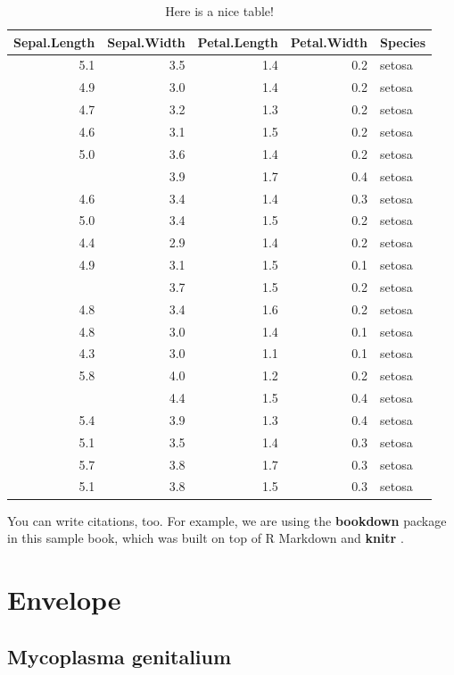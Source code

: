 \documentclass[]{tufte-book}
\begin{document}
\begin{table}[t]

\caption{\label{tab:nice-tab}Here is a nice table!}
\centering
\begin{tabular}{rrrrl}
\toprule
Sepal.Length & Sepal.Width & Petal.Length & Petal.Width & Species\\
\midrule
5.1 & 3.5 & 1.4 & 0.2 & setosa\\
4.9 & 3.0 & 1.4 & 0.2 & setosa\\
4.7 & 3.2 & 1.3 & 0.2 & setosa\\
4.6 & 3.1 & 1.5 & 0.2 & setosa\\
5.0 & 3.6 & 1.4 & 0.2 & setosa\\
\addlinespace
5.4 & 3.9 & 1.7 & 0.4 & setosa\\
4.6 & 3.4 & 1.4 & 0.3 & setosa\\
5.0 & 3.4 & 1.5 & 0.2 & setosa\\
4.4 & 2.9 & 1.4 & 0.2 & setosa\\
4.9 & 3.1 & 1.5 & 0.1 & setosa\\
\addlinespace
5.4 & 3.7 & 1.5 & 0.2 & setosa\\
4.8 & 3.4 & 1.6 & 0.2 & setosa\\
4.8 & 3.0 & 1.4 & 0.1 & setosa\\
4.3 & 3.0 & 1.1 & 0.1 & setosa\\
5.8 & 4.0 & 1.2 & 0.2 & setosa\\
\addlinespace
5.7 & 4.4 & 1.5 & 0.4 & setosa\\
5.4 & 3.9 & 1.3 & 0.4 & setosa\\
5.1 & 3.5 & 1.4 & 0.3 & setosa\\
5.7 & 3.8 & 1.7 & 0.3 & setosa\\
5.1 & 3.8 & 1.5 & 0.3 & setosa\\
\bottomrule
\end{tabular}
\end{table}

You can write citations, too. For example, we are using the
\textbf{bookdown} package \citep{R-bookdown} in this sample book, which
was built on top of R Markdown and \textbf{knitr} \citep{xie2015}.

\chapter{Envelope}\label{envelope}

\section{Mycoplasma genitalium}\label{mycoplasma-genitalium}
\end{document}
